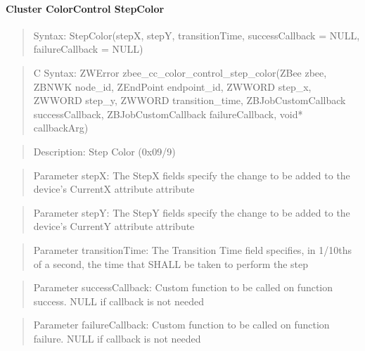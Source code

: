 \paragraph{Cluster ColorControl StepColor}
\begin{quote}Syntax: StepColor(stepX, stepY, transitionTime, successCallback = NULL, failureCallback = NULL)\end{quote}
\begin{quote}C Syntax: ZWError zbee\_cc\_color\_control\_step\_color(ZBee zbee, ZBNWK node\_id, ZEndPoint endpoint\_id, ZWWORD step\_x, ZWWORD step\_y, ZWWORD transition\_time, ZBJobCustomCallback successCallback, ZBJobCustomCallback failureCallback, void* callbackArg)\end{quote}
\begin{quote}Description: Step Color (0x09/9)\end{quote}
\begin{quote}Parameter stepX: The StepX fields specify the change to be added to the device's CurrentX attribute attribute\end{quote}
\begin{quote}Parameter stepY: The StepY fields specify the change to be added to the device's CurrentY attribute attribute\end{quote}
\begin{quote}Parameter transitionTime: The Transition Time field specifies, in 1/10ths of a second, the time that SHALL be taken to perform the step\end{quote}
\begin{quote}Parameter successCallback: Custom function to be called on function success. NULL if callback is not needed\end{quote}
\begin{quote}Parameter failureCallback: Custom function to be called on function failure. NULL if callback is not needed\end{quote}


